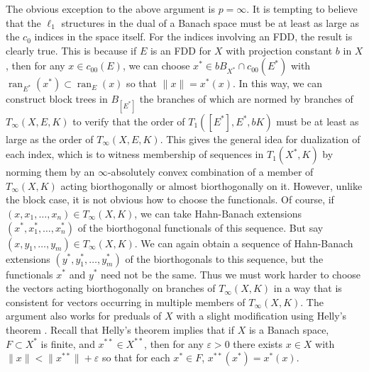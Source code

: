 \documentclass[12pt]{amsart}
\theoremstyle{definition}
\DeclareMathOperator{\ran}{ran}
\begin{document}
The obvious exception to the above argument is $p=\infty$.  It is tempting to believe that the $\ell_1$ structures in the dual of a Banach space must be at least as large as the $c_0$ indices in the space itself.  For the indices involving an FDD, the result is clearly true.  This is because if $E$ is an FDD for $X$ with projection constant $b$ in $X$, then for any $x\in c_{00}(E)$, we can choose $x^*\in bB_{X^*}\cap c_{00}(E^*)$ with $\ran_{E^*}(x^*)\subset\ran_E(x)$ so that $\|x\|=x^*(x)$.  In this way, we can construct block trees in $B_{[E^*]}$ the branches of which are normed by branches of $T_\infty(X, E, K)$ to verify that the order of $T_1([E^*], E^*, bK)$ must be at least as large as the order of $T_\infty(X, E, K)$.  This gives the general idea for dualization of each index, which is to witness membership of sequences in $T_1(X^*, K)$ by norming them by an $\infty$-absolutely convex combination of a member of $T_\infty(X,K)$ acting biorthogonally or almost biorthogonally on it.  However, unlike the block case, it is not obvious how to choose the functionals.  Of course, if $(x, x_1, \ldots, x_n)\in T_\infty(X, K)$, we can take Hahn-Banach extensions $(x^*, x_1^*, \ldots, x_n^*)$ of the biorthogonal functionals of this sequence.  But say $(x, y_1, \ldots, y_m)\in T_\infty(X, K)$.  We can again obtain a sequence of Hahn-Banach extensions $(y^*, y_1^*, \ldots, y_m^*)$ of the biorthogonals to this sequence, but the functionals $x^*$ and $y^*$ need not be the same.  Thus we must work harder to choose the vectors acting biorthogonally on branches of $T_\infty(X, K)$ in a way that is consistent for vectors occurring in multiple members of $T_\infty(X, K)$.  The argument also works for preduals of $X$ with a slight modification using Helly's theorem \cite{H}.  Recall that Helly's theorem implies that if $X$ is a Banach space, $F\subset X^*$ is finite, and $x^{**}\in X^{**}$, then for any $\varepsilon>0$ there exists $x\in X$ with $\|x\|<\|x^{**}\|+\varepsilon$ so that for each $x^*\in F$, $x^{**}(x^*)= x^*(x)$.  
\end{document}
